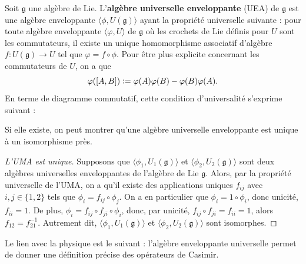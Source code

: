 \documentclass{article}
\begin{document}
\begin{definition}{}
    Soit $\mathfrak{g}$ une algèbre de Lie. L'\textbf{algèbre universelle enveloppante} (UEA) de $\mathfrak{g}$ est une algèbre enveloppante $\langle\phi, U(\mathfrak{g})\rangle$ ayant la propriété universelle suivante : pour toute algèbre enveloppante $\langle\varphi,U\rangle$ de $\mathfrak{g}$ où les crochets de Lie définis pour $U$ sont les commutateurs, il existe un unique homomorphisme associatif d'algèbre $f:U(\mathfrak{g})\to U$ tel que $\varphi=f\circ\phi$.     Pour être plus explicite concernant les commutateurs de $U$, on a que
    $$
    \varphi([A, B])\vcentcolon=\varphi(A)\varphi(B)-\varphi(B)\varphi(A).
    $$
    En terme de diagramme commutatif, cette condition d'universalité s'exprime suivant :

    \begin{center}
    \end{center}
\end{definition}

Si elle existe, on peut montrer qu'une algèbre universelle enveloppante est unique à un isomorphisme près.

\begin{proof}[L'UMA est unique]{}
    Supposons que $\langle\phi_1, U_1(\mathfrak{g})\rangle$ et $\langle\phi_2, U_2(\mathfrak{g})\rangle$ sont deux algèbres universelles enveloppantes de l'algèbre de Lie $\mathfrak{g}$. Alors, par la propriété universelle de l'UMA, on a qu'il existe des applications uniques $f_{ij}$ avec $i,j\in\{1,2\}$ tels que $\phi_i=f_{ij}\circ\phi_j$. On a en particulier que $\phi_i=1\circ\phi_i$, donc unicité, $f_{ii}=1$. De plus, $\phi_i=f_{ij}\circ f_{ji}\circ\phi_i$, donc, par unicité, $f_{ij}\circ f_{ji}=f_{ii}=1$, alors $f_{12}=f^{-1}_{21}$. Autrement dit, $\langle\phi_1, U_1(\mathfrak{g})\rangle$ et $\langle\phi_2, U_2(\mathfrak{g})\rangle$ sont isomorphes.
\end{proof}

Le lien avec la physique est le suivant : l'algèbre enveloppante universelle permet de donner une définition précise des opérateurs de Casimir.
\end{document}
